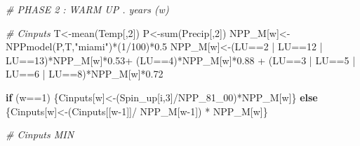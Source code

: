 \documentclass[
  10pt,
  b5paper,
]{book}
\newenvironment{Shaded}{\begin{snugshade}}{\end{snugshade}}
\newcommand{\CommentTok}[1]{\textcolor[rgb]{0.56,0.35,0.01}{\textit{#1}}}
\newcommand{\ControlFlowTok}[1]{\textcolor[rgb]{0.13,0.29,0.53}{\textbf{#1}}}
\newcommand{\DecValTok}[1]{\textcolor[rgb]{0.00,0.00,0.81}{#1}}
\newcommand{\FloatTok}[1]{\textcolor[rgb]{0.00,0.00,0.81}{#1}}
\newcommand{\FunctionTok}[1]{\textcolor[rgb]{0.00,0.00,0.00}{#1}}
\newcommand{\NormalTok}[1]{#1}
\newcommand{\OtherTok}[1]{\textcolor[rgb]{0.56,0.35,0.01}{#1}}
\newcommand{\SpecialCharTok}[1]{\textcolor[rgb]{0.00,0.00,0.00}{#1}}
\newcommand{\StringTok}[1]{\textcolor[rgb]{0.31,0.60,0.02}{#1}}
\begin{document}
\begin{Shaded}
\begin{Highlighting}[]
\CommentTok{\# PHASE 2  : WARM UP .  years (w)}

\CommentTok{\# Cinputs }
\NormalTok{T}\OtherTok{\textless{}{-}}\FunctionTok{mean}\NormalTok{(Temp[,}\DecValTok{2}\NormalTok{])}
\NormalTok{P}\OtherTok{\textless{}{-}}\FunctionTok{sum}\NormalTok{(Precip[,}\DecValTok{2}\NormalTok{])}
\NormalTok{NPP\_M[w]}\OtherTok{\textless{}{-}}\FunctionTok{NPPmodel}\NormalTok{(P,T,}\StringTok{"miami"}\NormalTok{)}\SpecialCharTok{*}\NormalTok{(}\DecValTok{1}\SpecialCharTok{/}\DecValTok{100}\NormalTok{)}\SpecialCharTok{*}\FloatTok{0.5}
\NormalTok{NPP\_M[w]}\OtherTok{\textless{}{-}}\NormalTok{(LU}\SpecialCharTok{==}\DecValTok{2} \SpecialCharTok{|}\NormalTok{ LU}\SpecialCharTok{==}\DecValTok{12} \SpecialCharTok{|}\NormalTok{ LU}\SpecialCharTok{==}\DecValTok{13}\NormalTok{)}\SpecialCharTok{*}\NormalTok{NPP\_M[w]}\SpecialCharTok{*}\FloatTok{0.53}\SpecialCharTok{+}\NormalTok{ (LU}\SpecialCharTok{==}\DecValTok{4}\NormalTok{)}\SpecialCharTok{*}\NormalTok{NPP\_M[w]}\SpecialCharTok{*}\FloatTok{0.88} \SpecialCharTok{+}\NormalTok{ (LU}\SpecialCharTok{==}\DecValTok{3} \SpecialCharTok{|}\NormalTok{ LU}\SpecialCharTok{==}\DecValTok{5} \SpecialCharTok{|}\NormalTok{ LU}\SpecialCharTok{==}\DecValTok{6} \SpecialCharTok{|}\NormalTok{ LU}\SpecialCharTok{==}\DecValTok{8}\NormalTok{)}\SpecialCharTok{*}\NormalTok{NPP\_M[w]}\SpecialCharTok{*}\FloatTok{0.72}

\ControlFlowTok{if}\NormalTok{ (w}\SpecialCharTok{==}\DecValTok{1}\NormalTok{) \{Cinputs[w]}\OtherTok{\textless{}{-}}\NormalTok{(Spin\_up[i,}\DecValTok{3}\NormalTok{]}\SpecialCharTok{/}\NormalTok{NPP\_81\_00)}\SpecialCharTok{*}\NormalTok{NPP\_M[w]\} }\ControlFlowTok{else}\NormalTok{ \{Cinputs[w]}\OtherTok{\textless{}{-}}\NormalTok{(Cinputs[[w}\DecValTok{{-}1}\NormalTok{]]}\SpecialCharTok{/}\NormalTok{ NPP\_M[w}\DecValTok{{-}1}\NormalTok{]) }\SpecialCharTok{*}\NormalTok{ NPP\_M[w]\} }

\CommentTok{\# Cinputs MIN}


\end{Highlighting}
\end{Shaded}
\end{document}
